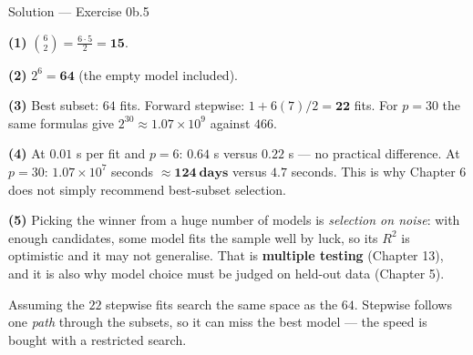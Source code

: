\documentclass[aspectratio=169,11pt]{beamer}
\begin{document}
\begin{frame}{Solution --- Exercise 0b.5}
  \begin{solutionbox}
    \textbf{(1)} $\binom{6}{2} = \frac{6 \cdot 5}{2} = \mathbf{15}$.

    \textbf{(2)} $2^6 = \mathbf{64}$ (the empty model included).

    \textbf{(3)} Best subset: $64$ fits. Forward stepwise:
    $1 + 6(7)/2 = \mathbf{22}$ fits. For $p = 30$ the same formulas give
    $2^{30} \approx 1.07\times10^{9}$ against $466$.

    \textbf{(4)} At $0.01$ s per fit and $p = 6$: $0.64$ s versus $0.22$ s ---
    no practical difference. At $p = 30$: $1.07\times10^{7}$ seconds
    $\approx \mathbf{124\ \text{days}}$ versus $4.7$ seconds. This is why
    Chapter 6 does not simply recommend best-subset selection.

    \textbf{(5)} Picking the winner from a huge number of models is
    \emph{selection on noise}: with enough candidates, some model fits the
    sample well by luck, so its $R^2$ is optimistic and it may not generalise.
    That is \textbf{multiple testing} (Chapter 13), and it is also why model
    choice must be judged on held-out data (Chapter 5).
  \end{solutionbox}
  \begin{mistake}
    Assuming the $22$ stepwise fits search the same
    space as the $64$. Stepwise follows one \emph{path} through the subsets,
    so it can miss the best model --- the speed is bought with a restricted
    search.
  \end{mistake}
\end{frame}
\end{document}
